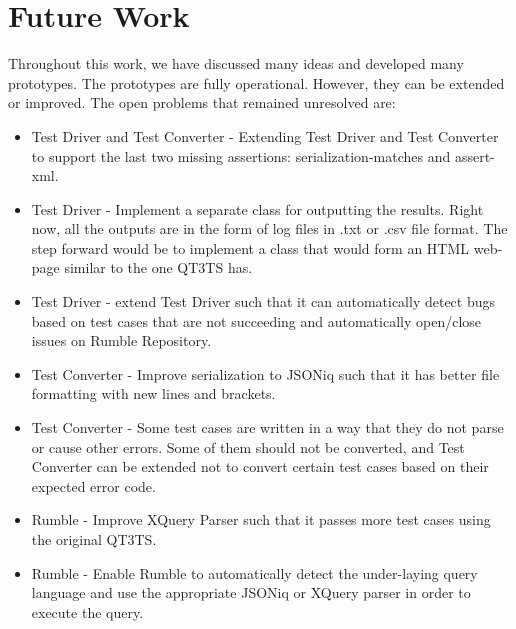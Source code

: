\section{Future Work}
Throughout this work, we have discussed many ideas and developed many prototypes. The prototypes are fully operational. However, they can be extended or improved. The open problems that remained unresolved are:
\begin{itemize}
	\item Test Driver and Test Converter - Extending Test Driver and Test Converter to support the last two missing assertions: serialization-matches and assert-xml.
	\item Test Driver - Implement a separate class for outputting the results. Right now, all the outputs are in the form of log files in .txt or .csv file format. The step forward would be to implement a class that would form an HTML web-page similar to the one QT3TS has.
	\item Test Driver - extend Test Driver such that it can automatically detect bugs based on test cases that are not succeeding and automatically open/close issues on Rumble Repository.
	\item Test Converter - Improve serialization to JSONiq such that it has better file formatting with new lines and brackets.
	\item Test Converter - Some test cases are written in a way that they do not parse or cause other errors. Some of them should not be converted, and Test Converter can be extended not to convert certain test cases based on their expected error code.
	\item Rumble - Improve XQuery Parser such that it passes more test cases using the original QT3TS.
	\item Rumble - Enable Rumble to automatically detect the under-laying query language and use the appropriate JSONiq or XQuery parser in order to execute the query. 
\end{itemize}